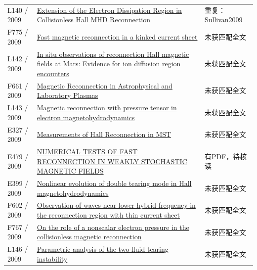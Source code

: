 \documentclass[UTF8,a4paper,11pt,openany,fontset=fandol]{ctexbook}
\begin{document}
\begin{longtable}{P{24mm}P{97mm}P{27mm}}
L140 / 2009 & \href{https://doi.org/10.48550/arxiv.0905.4765}{Extension of the Electron Dissipation Region in Collisionless Hall MHD Reconnection} & 重复：Sullivan2009\\

F775 / 2009 & \href{https://doi.org/10.1063/1.3106685}{Fast magnetic reconnection in a kinked current sheet} & 未获匹配全文\\

L142 / 2009 & \href{https://doi.org/10.1029/2009ja014544}{In situ observations of reconnection Hall magnetic fields at Mars: Evidence for ion diffusion region encounters} & 未获匹配全文\\

F661 / 2009 & \href{https://doi.org/10.1146/annurev-astro-082708-101726}{Magnetic Reconnection in Astrophysical and Laboratory Plasmas} & 未获匹配全文\\

L143 / 2009 & \href{https://doi.org/10.1063/1.3122050}{Magnetic reconnection with pressure tensor in electron magnetohydrodynamics} & 未获匹配全文\\

E327 / 2009 & \href{http://absimage.aps.org/image/DPP09/MWS_DPP09-2009-020006.pdf}{Measurements of Hall Reconnection in MST} & 未获匹配全文\\

E479 / 2009 & \href{https://doi.org/10.1088/0004-637x/700/1/63}{NUMERICAL TESTS OF FAST RECONNECTION IN WEAKLY STOCHASTIC MAGNETIC FIELDS} & 有PDF，待核读\\

E399 / 2009 & \href{https://doi.org/10.1063/1.3276534}{Nonlinear evolution of double tearing mode in Hall magnetohydrodynamics} & 未获匹配全文\\

F602 / 2009 & \href{https://doi.org/10.1029/2008ja013427}{Observation of waves near lower hybrid frequency in the reconnection region with thin current sheet} & 未获匹配全文\\

F767 / 2009 & \href{https://doi.org/10.1063/1.3266419}{On the role of a nonscalar electron pressure in the collisionless magnetic reconnection} & 未获匹配全文\\

L146 / 2009 & \href{https://doi.org/10.1088/0741-3335/51/5/055018}{Parametric analysis of the two-fluid tearing instability} & 未获匹配全文\\


\end{longtable}
\end{document}
